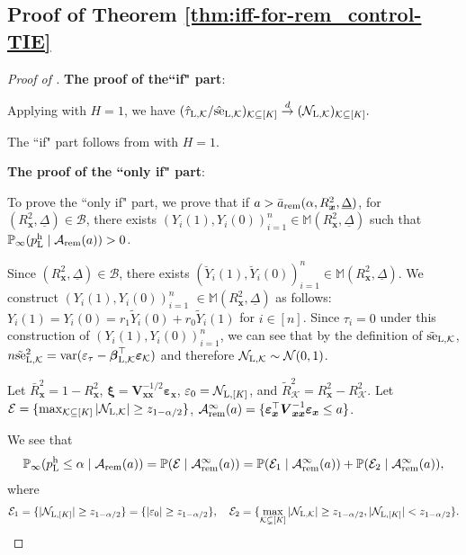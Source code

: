 \documentclass[12pt]{article}
\newcommand{\se}{\textnormal{se}}
\newcommand{\Lin}{\textnormal{L}}
\newcommand{\Prob}{\mathbb{P}}
\newcommand{\var}{\operatorname{var}}
\newcommand{\wconv}{\stackrel{d}{\rightarrow}}
\newcommand{\mk}{\mathcal{K}}
\newcommand{\ma}{\mathcal{A}}
\newcommand{\rem}{\textnormal{rem}}
\newcommand{\bs}{\boldsymbol}
\newcommand{\hpL}{p_\textnormal{L}^{\textnormal{h}}}
\begin{document}
\subsection{Proof of Theorem \ref{thm:iff-for-rem_control-TIE}}
\begin{proof}[Proof of ]
\noindent \textbf{The proof of the``if" part}:

Applying  with $H=1$, we have $(\hat{\tau}_{\Lin,\mk}/\hat{\se}_{\Lin,\mk})_{\mk\subseteq [K]} \wconv (\mathcal{N}_{\Lin,\mk})_{\mk \subseteq [K]}.$

 The ``if" part  follows from  with $H=1$. 

\noindent \textbf{The proof of the ``only if" part}:

To prove the ``only if" part, we prove that if $a > \bar{a}_{\rem}(\alpha,R^2_{\bs{x}},\underline{\Delta})$, for $(R^2_{\bs{x}}, \underline{\Delta}) \in \mathcal{B}$, there exists $(Y_i(1),Y_i(0))_{i=1}^n \in \mathbb{M}(R^2_{\bs{x}},\underline{\Delta})$ such that $\Prob_{\infty}(\hpL\mid \ma_{\rem}(a)) > 0$. 

Since $(R^2_{\bs{x}}, \underline{\Delta}) \in \mathcal{B}$, there exists $(\breve{Y}_i(1), \breve{Y}_i(0))_{i=1}^n \in \mathbb{M}(R^2_{\bs{x}},\underline{\Delta})$.  We construct $(Y_i(1),Y_i(0))_{i=1}^n$ $ \in \mathbb{M}(R^2_{\bs{x}},\underline{\Delta})$ as follows: $Y_i(1)=Y_i(0) = r_1 \tilde{Y}_i(0)+r_0 \tilde{Y}_i(1)$ for $i\in [n]$. Since $\tau_i = 0$ under this construction of $(Y_i(1),Y_i(0))_{i=1}^n$, we can see that by the definition of $\tilde{\se}_{\Lin, \mk}$, $n\tilde{\se}_{\Lin, \mk}^2 = \var(\varepsilon_{\tau}-\bs{\beta}_{\Lin, \mk}^\top \bs{\varepsilon}_{\mk})$ and therefore $ \mathcal{N}_{\Lin, \mk} \sim \mathcal{N}(0,1)$. 

 Let $\bar{R}_{\bs{x}}^2 = 1- R_{\bs{x}}^2$, $\bs{\xi} = \bs{V}_{\bs{x}\bs{x}}^{-1/2} \bs{\varepsilon}_{\bs{x}}$, $\varepsilon_0 =  \mathcal{N}_{\Lin,[K]}$, and $\tilde{R}^2_{\mk} = R^2_{\bs{x}}-R^2_{\mk}$. Let $\mathcal{E} = \{ \max_{\mk \subseteq [K]} |\mathcal{N}_{\Lin,\mk}| \geq z_{1-\alpha/2}\}$, $\ma_{\rem}^\infty (a) = \{\bs{\varepsilon}_{\bs{x}}^\top \bs{V}_{\bs{x}\bs{x}}^{-1}\bs{\varepsilon}_{\bs{x}}\leq a\}$. 

We see that 
\begin{align*}
\Prob_{\infty}(\hpL \leq \alpha \mid \mathcal{A}_{\rem}(a)) = \Prob(\mathcal{E}\mid\mathcal{A}_{\rem}^{\infty}(a)) = \Prob(\mathcal{E}_1\mid\mathcal{A}_{\rem}^{\infty}(a))+\Prob(\mathcal{E}_2\mid\mathcal{A}_{\rem}^{\infty}(a)),
\end{align*}
where
\begin{gather*}
    \mathcal{E}_1 = \{ |\mathcal{N}_{\Lin,[K]}| \geq z_{1-\alpha/2}\} = \{ |\varepsilon_0| \geq z_{1-\alpha/2}\},\quad \mathcal{E}_2 = \{ \max_{\mk \subsetneq [K]} |\mathcal{N}_{\Lin,\mk}| \geq z_{1-\alpha/2}, |\mathcal{N}_{\Lin,[K]}| < z_{1-\alpha/2}\}.
\end{gather*}


\end{proof}
\end{document}
